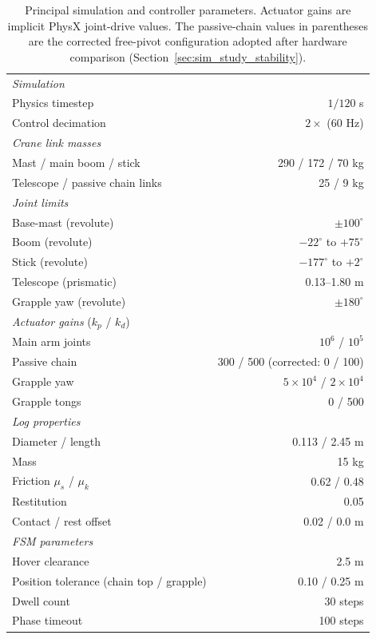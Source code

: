 \begin{table}[t]
\centering
\caption{Principal simulation and controller parameters. Actuator gains are
implicit PhysX joint-drive values. The passive-chain values in parentheses are
the corrected free-pivot configuration adopted after hardware comparison
(Section~\ref{sec:sim_study_stability}).}
\label{tab:sim_params}
\small
\begin{tabular}{lr}
\hline
\textit{Simulation} & \\
Physics timestep & $1/120$ s \\
Control decimation & $2\times$ (60 Hz) \\
\hline
\textit{Crane link masses} & \\
Mast / main boom / stick & 290 / 172 / 70 kg \\
Telescope / passive chain links & 25 / 9 kg \\
\hline
\textit{Joint limits} & \\
Base-mast (revolute) & $\pm 100^{\circ}$ \\
Boom (revolute) & $-22^{\circ}$ to $+75^{\circ}$ \\
Stick (revolute) & $-177^{\circ}$ to $+2^{\circ}$ \\
Telescope (prismatic) & 0.13--1.80 m \\
Grapple yaw (revolute) & $\pm 180^{\circ}$ \\
\hline
\textit{Actuator gains} ($k_p$ / $k_d$) & \\
Main arm joints & $10^{6}$ / $10^{5}$ \\
Passive chain & 300 / 500 \; (corrected: 0 / 100) \\
Grapple yaw & $5\times 10^{4}$ / $2\times 10^{4}$ \\
Grapple tongs & 0 / 500 \\
\hline
\textit{Log properties} & \\
Diameter / length & 0.113 / 2.45 m \\
Mass & 15 kg \\
Friction $\mu_s$ / $\mu_k$ & 0.62 / 0.48 \\
Restitution & 0.05 \\
Contact / rest offset & 0.02 / 0.0 m \\
\hline
\textit{FSM parameters} & \\
Hover clearance & 2.5 m \\
Position tolerance (chain top / grapple) & 0.10 / 0.25 m \\
Dwell count & 30 steps \\
Phase timeout & 100 steps \\
\hline
\end{tabular}
\end{table}

